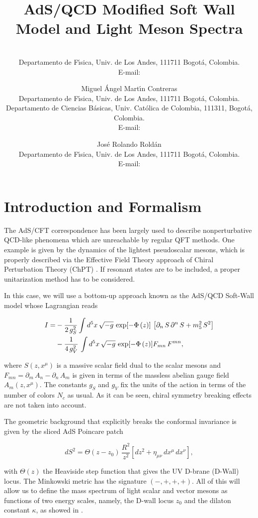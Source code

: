 \documentclass{PoS}
\title{AdS/QCD Modified Soft Wall Model and Light Meson Spectra}
\author{\speaker{Santiago Cort\'es} \\
        Departamento de F\'{\i}sica, Univ. de Los  Andes, 111711 Bogot\'a, Colombia.\\
        E-mail: \email{js.cortes125@uniandes.edu.co}}
\author{Miguel \'Angel Mart\'{\i}n Contreras\\
        Departamento de F\'{\i}sica, Univ. de Los  Andes, 111711 Bogot\'a, Colombia. \\
				Departamento de Ciencias B\'asicas, Univ. Cat\'olica de Colombia, 111311, Bogot\'a, 			Colombia. \\
        E-mail: \email{ma.martin41@uniandes.edu.co}}
\author{Jos\'e Rolando Rold\'an\\
        Departamento de F\'{\i}sica, Univ. de Los  Andes, 111711 Bogot\'a, Colombia.\\
        E-mail: \email{jroldan@uniandes.edu.co}}
\begin{document}
\section{Introduction and Formalism}

The AdS/CFT correspondence \cite{Maldacena:1997re} has been largely used to describe nonperturbative QCD-like phenomena which are unreachable by regular QFT methods. One example is given by the dynamics of the lightest pseudoscalar mesons, which is properly described via the Effective Field Theory approach of Chiral Perturbation Theory (ChPT) \cite{Gasser:1983yg}. If resonant states are to be included, a proper unitarization method has to be considered.

In this case, we will use a bottom-up approach known as the AdS/QCD Soft-Wall model whose Lagrangian reads \cite{Karch:2006pv}

\begin{align}
I=&-\frac{1}{2\,g_S^2}\int{d^5x\,\sqrt{-g}\,\exp[-\Phi\left(z\right)]\,\left[\partial_n\,S\,\partial^n\,S+m_5^2\,S^2\right]}\notag \\
&-\frac{1}{4\,g_V^2}\,\int{d^5x\,\sqrt{-g}\,\exp[-\Phi\left(z\right)]F_{mn}\,F^{mn}}, \label{general-action}
\end{align}

\noindent where $S\left(z,x^\mu\right)$ is a massive scalar field dual to the scalar mesons and $F_{mn}=\partial_m\,A_n-\partial_n\,A_m$ is given in terms of the massless abelian gauge field $A_m\left(z,x^\mu\right)$. The constants $g_S$ and $g_V$ fix the units of the action in terms of the number of colors $N_c$ as usual. As it can be seen, chiral symmetry breaking effects are not taken into account.

The geometric background that explicitly breaks the conformal invariance is given by the sliced AdS Poincare patch \cite{Braga:2015jca}

\begin{equation}\label{geometry}
dS^2=\Theta\left(z-z_0\right)\,\frac{R^2}{z^2}\left[dz^2+\eta_{\mu\nu}\,dx^\mu\,dx^\nu\right],
\end{equation}

\noindent with $\Theta\left(z\right)$ the Heaviside step function that gives the UV D-brane (D-Wall) locus. The Minkowski metric has the signature $(-, +, +, +)$. All of this will allow us to define the mass spectrum of light scalar and vector mesons as functions of two energy scales, namely, the D-wall locus $z_0$ and the dilaton constant $\kappa$, as showed in \cite{Braga:2015jca}.
\end{document}
